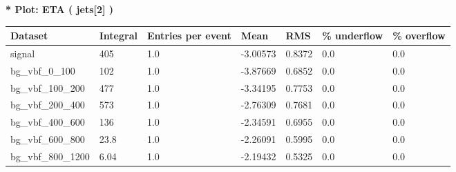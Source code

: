 \documentclass[a4paper, 10pt]{article}
\begin{document}
\textbf{* Plot: ETA ( jets[2] ) }\\
   \begin{table}[H]
  \begin{center}
    \begin{tabular}{|m{23.0mm}|m{23.0mm}|m{18.0mm}|m{19.0mm}|m{19.0mm}|m{19.0mm}|m{19.0mm}|}
      \hline
      {\cellcolor{yellow}         Dataset}& {\cellcolor{yellow}         Integral}& {\cellcolor{yellow}         Entries per event}& {\cellcolor{yellow}         Mean}& {\cellcolor{yellow}         RMS}& {\cellcolor{yellow}         \% underflow}& {\cellcolor{yellow}         \% overflow}\\
      \hline
      {\cellcolor{white}         signal}& {\cellcolor{white}         405}& {\cellcolor{white}         1.0}& {\cellcolor{white}         -3.00573}& {\cellcolor{white}         0.8372}& {\cellcolor{green}         0.0}& {\cellcolor{green}         0.0}\\
      \hline
      {\cellcolor{white}         bg\_vbf\_0\_100}& {\cellcolor{white}         102}& {\cellcolor{white}         1.0}& {\cellcolor{white}         -3.87669}& {\cellcolor{white}         0.6852}& {\cellcolor{green}         0.0}& {\cellcolor{green}         0.0}\\
      \hline
      {\cellcolor{white}         bg\_vbf\_100\_200}& {\cellcolor{white}         477}& {\cellcolor{white}         1.0}& {\cellcolor{white}         -3.34195}& {\cellcolor{white}         0.7753}& {\cellcolor{green}         0.0}& {\cellcolor{green}         0.0}\\
      \hline
      {\cellcolor{white}         bg\_vbf\_200\_400}& {\cellcolor{white}         573}& {\cellcolor{white}         1.0}& {\cellcolor{white}         -2.76309}& {\cellcolor{white}         0.7681}& {\cellcolor{green}         0.0}& {\cellcolor{green}         0.0}\\
      \hline
      {\cellcolor{white}         bg\_vbf\_400\_600}& {\cellcolor{white}         136}& {\cellcolor{white}         1.0}& {\cellcolor{white}         -2.34591}& {\cellcolor{white}         0.6955}& {\cellcolor{green}         0.0}& {\cellcolor{green}         0.0}\\
      \hline
      {\cellcolor{white}         bg\_vbf\_600\_800}& {\cellcolor{white}         23.8}& {\cellcolor{white}         1.0}& {\cellcolor{white}         -2.26091}& {\cellcolor{white}         0.5995}& {\cellcolor{green}         0.0}& {\cellcolor{green}         0.0}\\
      \hline
      {\cellcolor{white}         bg\_vbf\_800\_1200}& {\cellcolor{white}         6.04}& {\cellcolor{white}         1.0}& {\cellcolor{white}         -2.19432}& {\cellcolor{white}         0.5325}& {\cellcolor{green}         0.0}& {\cellcolor{green}         0.0}\\

\end{tabular}
\end{center}
\end{table}
\end{document}
